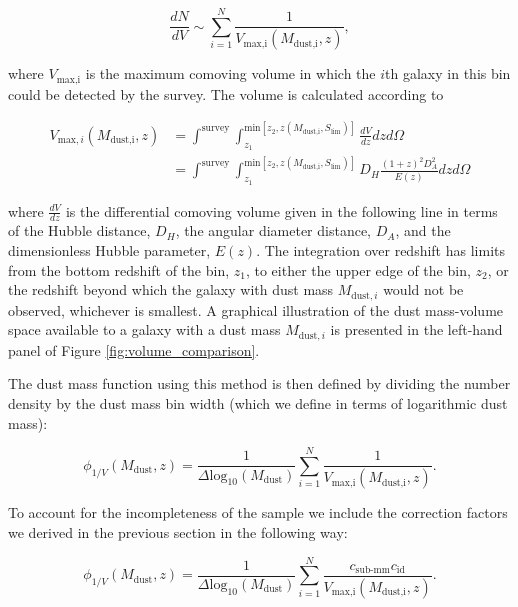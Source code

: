 \begin{equation}
    \frac{dN}{dV} \sim \sum_{i=1}^N \frac{1}{V_{\textrm{max,i}}(M_{\textrm{dust,i}},z)},
\label{eq:number_density_1/v_method}
\end{equation}

\noindent where $V_{\textrm{max,i}}$ is the maximum comoving volume in which the $i$th galaxy in this bin could be detected by the survey. The volume is calculated according to

\begin{align}
    V_{\textrm{max},i}(M_{\textrm{dust,i}},z) &= \int^{\scriptscriptstyle \textrm{survey}} \int_{\scriptscriptstyle z_1}^{\scriptscriptstyle \textrm{min}[z_2, z(M_{\textrm{dust,i}},S_{\textrm{lim}})]} \frac{dV}{dz} dz d\Omega \nonumber \\
    &= \int^{\scriptscriptstyle \textrm{survey}} \int_{\scriptscriptstyle z_1}^{\scriptscriptstyle \textrm{min}[z_2, z(M_{\textrm{dust,i}},S_{\textrm{lim}})]} D_H \frac{(1+z)^2 D_A^2}{E(z)} dz d\Omega
\label{eq:volume_1/v_method}
\end{align}

\noindent where $\frac{dV}{dz}$ is the differential comoving volume given in the following line in terms of the Hubble distance, $D_H$, the angular diameter distance, $D_A$, and the dimensionless Hubble parameter, $E(z)$. The integration over redshift has limits from the bottom redshift of the bin, $z_1$, to either the upper edge of the bin, $z_2$, or the redshift beyond which the galaxy with dust mass $M_{\textrm{dust},i}$ would not be observed, whichever is smallest. A graphical illustration of the dust mass-volume space available to a galaxy with a dust mass $M_{\textrm{dust},i}$ is presented in the left-hand panel of Figure \ref{fig:volume_comparison}.

The dust mass function using this method is then defined by dividing the number density by the dust mass bin width (which we define in terms of logarithmic dust mass):

\begin{equation}
    \phi_{1/V}(M_{\textrm{dust}},z) = \frac{1}{\Delta \textrm{log}_{10}(M_{\textrm{dust}})} \sum_{i=1}^N \frac{1}{V_{\textrm{max,i}}(M_{\textrm{dust,i}},z)}.
\label{eq:phi_1/v_method}
\end{equation}

To account for the incompleteness of the sample we include the correction factors we derived in the previous section in the following way:

\begin{equation}
    \phi_{1/V}(M_{\textrm{dust}},z) = \frac{1}{\Delta \textrm{log}_{10}(M_{\textrm{dust}})} \sum_{i=1}^N \frac{c_{\scriptscriptstyle \textrm{sub-mm}} c_{\scriptscriptstyle \textrm{id}}}{V_{\textrm{max,i}}(M_{\textrm{dust,i}},z)}.
\label{eq:phi_1/v_method}
\end{equation}

